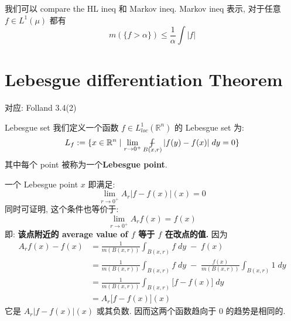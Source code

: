 \documentclass[lang=cn,11pt]{elegantbook}
\newcommand*{\avint}{\mathop{\ooalign{$\int$\cr$-$}}}
\begin{document}
\begin{remark}
    我们可以 compare the HL ineq 和 Markov ineq. Markov ineq 表示, 对于任意 $f \in L^1(\mu)$ 都有 \[
    m(\{f> \alpha\}) \leq \frac{1}{\alpha} \int |f|
    \]
\end{remark}




\chapter{Lebesgue differentiation Theorem}
对应: Folland 3.4(2)
\begin{definition}{Lebesgue set}
    我们定义一个函数 $f\in L^1_{loc}(\mathbb{R}^n)$ 的 Lebesgue set 为: \[
L_f := \{ x \in \mathbb{R}^n \mid \lim_{r \to 0^+} \avint_{B(x,r)} |f(y) - f(x) | \; dy = 0   \}
\]
其中每个 point 被称为一个\textbf{Lebesgue point}.
\end{definition}
\begin{remark}
    一个 Lebesgue point $x$ 即满足: \[
\lim_{r\to 0^+} A_r |f- f(x)| (x)  = 0
\]
同时可证明, 这个条件也等价于: \[
\lim_{r\to 0^+} A_rf(x)= f(x) 
\]
即: \textbf{该点附近的 average value of $f$ 等于 $f$ 在改点的值. }
因为 \begin{align}
    A_rf(x)-  f(x)  &= \frac{1}{m(B(x,r))} \int_{B(x,r)} f  \; dy\; -  \; f(x)  \\
    & = \frac{1}{m(B(x,r))} \int_{B(x,r)} f\;dy  \; -  \;   \frac{f(x)}{ m(B(x,r)) }\int_{B(x,r)} 1 \;dy\\
    & = \frac{1}{m(B(x,r))} \int_{B(x,r)}\big[ f  - f(x) \big]\; dy\\
    & = A_r \big[ f-f(x) \big] (x)
\end{align}
它是 $A_r |f- f(x)| (x) $ 或其负数. 因而这两个函数趋向于 0 的趋势是相同的.
\end{remark}
\end{document}
